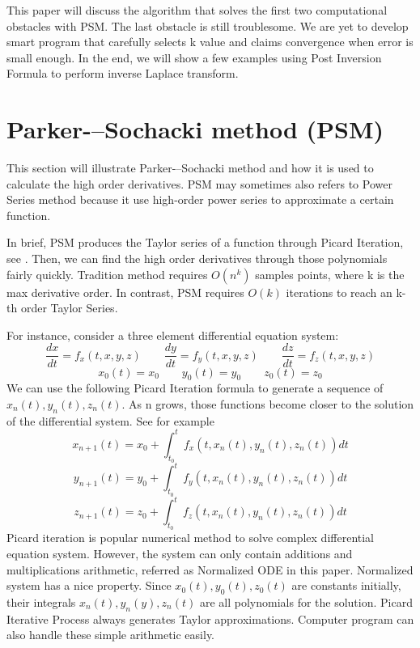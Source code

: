 \documentclass[12pt]{article}
\begin{document}
This paper will discuss the algorithm that solves the first two computational obstacles with PSM. The last obstacle is still troublesome. We are yet to develop smart program that carefully selects k value and claims convergence when error is small enough. In the end, we will show a few examples using Post Inversion Formula to perform inverse Laplace transform.

\section{Parker-–Sochacki method (PSM)}

This section will illustrate Parker-–Sochacki method and how it is used to calculate the high order derivatives. PSM may sometimes also refers to Power Series method because it use high-order power series to approximate a certain function.

In brief, PSM produces the Taylor series of a function through Picard Iteration, see \cite{PSM}. Then, we can find the high order derivatives through those polynomials fairly quickly. Tradition method requires $O(n^{k})$ samples points, where k is the max derivative order. In contrast, PSM requires $O(k)$ iterations to reach an k-th order Taylor Series.

For instance, consider a three element differential equation system:
\begin{equation}
\frac{dx}{dt} = f_{x}(t, x, y, z) \qquad
\frac{dy}{dt} = f_{y}(t, x, y, z) \qquad
\frac{dz}{dt} = f_{z}(t, x, y, z)
\end{equation}	
\begin{equation}
x_{0}(t) = x_{0} \qquad
y_{0}(t) = y_{0} \qquad
z_{0}(t) = z_{0}
\end{equation}
We can use the following Picard Iteration formula to generate a sequence of $x_{n}(t),y_{n}(t),z_{n}(t)$. As n grows, those functions become closer to the solution of the differential system. See for example \cite{PICARD}
\begin{equation}
x_{n+1}(t) = x_{0} + \int_{t_{0}}^{t} f_{x}(t, x_{n}(t),y_{n}(t),z_{n}(t)) dt
\end{equation}
\begin{equation}
y_{n+1}(t) = y_{0} + \int_{t_{0}}^{t} f_{y}(t, x_{n}(t),y_{n}(t),z_{n}(t)) dt
\end{equation}
\begin{equation}
z_{n+1}(t) = z_{0} + \int_{t_{0}}^{t} f_{z}(t, x_{n}(t),y_{n}(t),z_{n}(t)) dt
\end{equation}
Picard iteration is popular numerical method to solve complex differential equation system. However, the system can only contain additions and multiplications arithmetic, referred as Normalized ODE in this paper.
Normalized system has a nice property. Since $x_{0}(t),y_{0}(t),z_{0}(t)$ are constants initially, their integrals $x_{n}(t),y_{n}(y),z_{n}(t)$ are all polynomials for the solution. Picard Iterative Process always generates Taylor approximations. Computer program can also handle these simple arithmetic easily.
\end{document}
